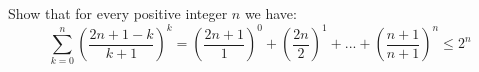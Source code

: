 Show that for every positive integer $n$ we have:$$\sum_{k=0}^{n}\left(\frac{2n+1-k}{k+1}\right)^k=\left(\frac{2n+1}{1}\right)^0+\left(\frac{2n}{2}\right)^1+...+\left(\frac{n+1}{n+1}\right)^n\leq 2^n$$